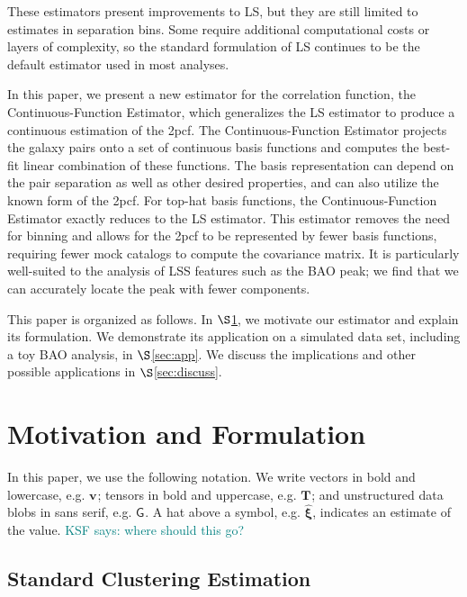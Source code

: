 \documentclass[modern]{aastex62}
\newcommand{\cf}{2pcf\xspace} %
\newcommand{\Est}{The Continuous-Function Estimator\xspace}
\newcommand{\est}{the Continuous-Function Estimator\xspace}
\newcommand{\LS}{LS\xspace}
\newcommand{\bld}[1]{\bm{#1}} %
\newcommand{\vv}[1]{\bld{v}_\mathrm{#1}}
\newcommand{\TT}[1]{\bld{T}_\mathrm{#1}}
\newcommand{\GG}[1]{\mathsf{G}_{#1}}
\newcommand{\KSF}[1]{\textcolor{teal}{KSF says: #1}}
\begin{document}
These estimators present improvements to \LS, but they are still limited to estimates in separation bins.
Some require additional computational costs or layers of complexity, so the standard formulation of \LS continues to be the default estimator used in most analyses.

In this paper, we present a new estimator for the correlation function, \est, which generalizes the \LS estimator to produce a continuous estimation of the \cf. 
\Est projects the galaxy pairs onto a set of continuous basis functions and computes the best-fit linear combination of these functions.
The basis representation can depend on the pair separation as well as other desired properties, and can also utilize the known form of the \cf.
For top-hat basis functions, \est exactly reduces to the \LS estimator. 
This estimator removes the need for binning and allows for the \cf to be represented by fewer basis functions, requiring fewer mock catalogs to compute the covariance matrix.
It is particularly well-suited to the analysis of LSS features such as the BAO peak; we find that we can accurately locate the peak with fewer components.

This paper is organized as follows. 
In $\S$\ref{sec:motiv}, we motivate our estimator and explain its formulation.
We demonstrate its application on a simulated data set, including a toy BAO analysis, in $\S$\ref{sec:app}.
We discuss the implications and other possible applications in $\S$\ref{sec:discuss}. 

\section{Motivation and Formulation} 
\label{sec:motiv}

In this paper, we use the following notation.
We write vectors in bold and lowercase, e.g. $\vv{}$; tensors in bold and uppercase, e.g. $\TT{}$; and unstructured data blobs in sans serif, e.g. $\GG{}$.
A hat above a symbol, e.g. $\bld{\hat{\xi}}$, indicates an estimate of the value.
\KSF{where should this go?}

\subsection{Standard Clustering Estimation}
\end{document}
